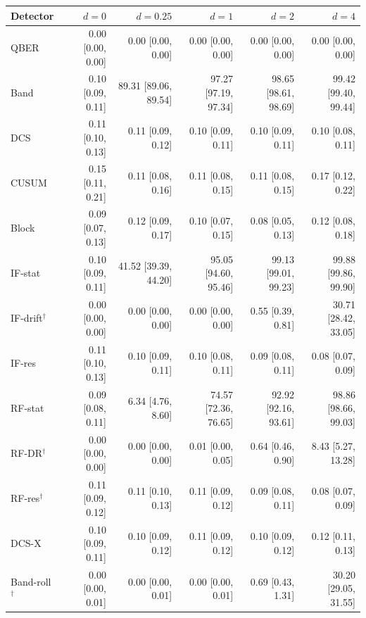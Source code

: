 \begin{tabular}{lrrrrr}
\hline
Detector & $d=0$ & $d=0.25$ & $d=1$ & $d=2$ & $d=4$\\
\hline
QBER & 0.00 [0.00, 0.00] & 0.00 [0.00, 0.00] & 0.00 [0.00, 0.00] & 0.00 [0.00, 0.00] & 0.00 [0.00, 0.00]\\
Band & 0.10 [0.09, 0.11] & 89.31 [89.06, 89.54] & 97.27 [97.19, 97.34] & 98.65 [98.61, 98.69] & 99.42 [99.40, 99.44]\\
DCS & 0.11 [0.10, 0.13] & 0.11 [0.09, 0.12] & 0.10 [0.09, 0.11] & 0.10 [0.09, 0.11] & 0.10 [0.08, 0.11]\\
CUSUM & 0.15 [0.11, 0.21] & 0.11 [0.08, 0.16] & 0.11 [0.08, 0.15] & 0.11 [0.08, 0.15] & 0.17 [0.12, 0.22]\\
Block & 0.09 [0.07, 0.13] & 0.12 [0.09, 0.17] & 0.10 [0.07, 0.15] & 0.08 [0.05, 0.13] & 0.12 [0.08, 0.18]\\
IF-stat & 0.10 [0.09, 0.11] & 41.52 [39.39, 44.20] & 95.05 [94.60, 95.46] & 99.13 [99.01, 99.23] & 99.88 [99.86, 99.90]\\
IF-drift$^\dagger$ & 0.00 [0.00, 0.00] & 0.00 [0.00, 0.00] & 0.00 [0.00, 0.00] & 0.55 [0.39, 0.81] & 30.71 [28.42, 33.05]\\
IF-res & 0.11 [0.10, 0.13] & 0.10 [0.09, 0.11] & 0.10 [0.08, 0.11] & 0.09 [0.08, 0.11] & 0.08 [0.07, 0.09]\\
RF-stat & 0.09 [0.08, 0.11] & 6.34 [4.76, 8.60] & 74.57 [72.36, 76.65] & 92.92 [92.16, 93.61] & 98.86 [98.66, 99.03]\\
RF-DR$^\dagger$ & 0.00 [0.00, 0.00] & 0.00 [0.00, 0.00] & 0.01 [0.00, 0.05] & 0.64 [0.46, 0.90] & 8.43 [5.27, 13.28]\\
RF-res$^\dagger$ & 0.11 [0.09, 0.12] & 0.11 [0.10, 0.13] & 0.11 [0.09, 0.12] & 0.09 [0.08, 0.11] & 0.08 [0.07, 0.09]\\
DCS-X & 0.10 [0.09, 0.11] & 0.10 [0.09, 0.12] & 0.11 [0.09, 0.12] & 0.10 [0.09, 0.12] & 0.12 [0.11, 0.13]\\
Band-roll$^\dagger$ & 0.00 [0.00, 0.01] & 0.00 [0.00, 0.01] & 0.00 [0.00, 0.01] & 0.69 [0.43, 1.31] & 30.20 [29.05, 31.55]\\
\hline
\end{tabular}